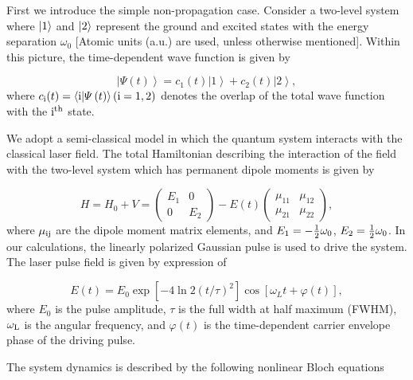 \documentclass[10pt,letterpaper]{article}
\begin{document}
First we introduce the simple non-propagation case. Consider a two-level system where $\left| {\rm{1}} \right\rangle$ and $\left| {\rm{2}} \right\rangle$ represent the ground and excited states with the energy separation $ \omega_0 $ [Atomic units (a.u.) are used, unless otherwise mentioned]. Within this picture, the time-dependent wave function is given by

\begin{equation}
\left| {\varPsi \left( t \right)} \right\rangle  = {c_1}(t)\left| 1 \right\rangle  + {c_2}(t)\left| 2 \right\rangle,
\label{(eq1)}
\end{equation}
where $ c_{\rm{i}}(t) = \left\langle {\rm{i}} | \varPsi \left( t \right) \right\rangle(\rm{i}=1,2) $ denotes the overlap of the total wave function with the $\rm{i}^{th}$ state.

We adopt a semi-classical model in which the quantum system interacts with the classical laser field. The total Hamiltonian describing the interaction of the field with the two-level system which has permanent dipole moments is given by \cite{YangWeifeng-Two-Level-PLA-2007}

\begin{equation}
H = {H_0} + V = \left( {\begin{array}{*{20}{c}}
	{{E_1}}&0\\
	0&{{E_2}}
	\end{array}} \right) - E(t)\left( {\begin{array}{*{20}{c}}
	{{\mu _{11}}}&{{\mu _{12}}}\\
	{{\mu _{21}}}&{{\mu _{22}}}
	\end{array}} \right),
\label{eq2}
\end{equation}
where $ \mu_{\rm{ij}} $ are the dipole moment matrix elements, and ${E_1} =  - {1 \over 2}{\omega _0}$, ${E_2} =   {1 \over 2}{\omega _0}$. In our calculations, the linearly polarized Gaussian pulse is used to drive the system. The laser pulse field is given by expression of

\begin{equation}
E(t) = {E_0}\exp \left[ { - 4\ln 2{{\left( {t/\tau } \right)}^2}} \right]\cos \left[ {{\omega _L}t + \varphi \left( t \right)} \right],
\label{eq3}
\end{equation}
where $ E_{0} $ is the pulse amplitude, $ \tau $ is the full width at half maximum (FWHM), $ \omega_{\rm{L}} $ is the angular frequency, and $ \varphi(t) $ is the time-dependent carrier envelope phase of the driving pulse.

The system dynamics is described by the following nonlinear Bloch equations
\end{document}
